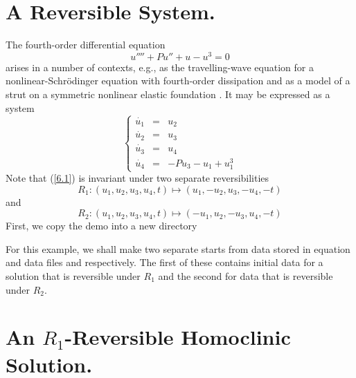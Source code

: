 \documentclass[12pt]{report}
\begin{document}
\section{ A Reversible System.}
The fourth-order differential equation
$$
u'''' + P u'' + u -u^3 =0
$$
arises in a number of contexts, e.g., as the travelling-wave
equation for a nonlinear-Schr\"{o}dinger equation with fourth-order
dissipation \cite{BuAk:95} and as a model of a strut on a symmetric 
nonlinear elastic foundation \cite{HuBoTh:89}. It may be expressed as
a system
\begin{equation}
\left \{ 
\begin{array}{rcl}
\dot{u_1} & = & u_2 \\
\dot{u_2} & = & u_3 \\
\dot{u_3} & = & u_4 \\
\dot{u_4} & = & -P u_3 - u_1 + u_1^3
\end{array}
\right.  
\label{6.1}
\end{equation}
Note that (\ref{6.1}) is invariant under two separate reversibilities
\begin{equation}
R_1: (u_1,u_2,u_3,u_4,t) \mapsto (u_1,-u_2,u_3,-u_4,-t)  
\label{6.R1}
\end{equation}
and 
\begin{equation}
R_2: (u_1,u_2,u_3,u_4,t) \mapsto (-u_1,u_2,-u_3,u_4,-t)  
\label{6.R2}
\end{equation}
First, we copy the demo into a new directory 
\begin{center}
\end{center}
For this example, we shall make two separate starts
from data stored in equation and data files  and  respectively. The first
of these contains initial data for a solution that is reversible
under $R_1$ and the second for data that is reversible under $R_2$. 
%


\section{An \texorpdfstring{$R_1$}{R1}-Reversible Homoclinic Solution.}
\end{document}
